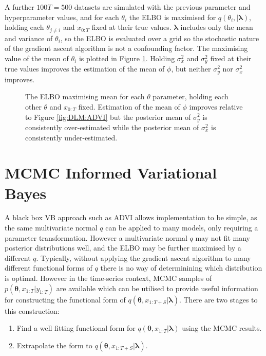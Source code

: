 \documentclass[12pt,a4paper]{article}%
\numberwithin{equation}{section}
\begin{document}
A further $100 T = 500$ datasets are simulated with the previous parameter and hyperparameter values, and for each $\theta_i$ the ELBO is maximised for $q(\theta_i, | \boldsymbol{\lambda})$, holding each $\theta_{j \neq i}$ and $x_{0:T}$ fixed at their true values. $\boldsymbol{\lambda}$ includes only the mean and variance of $\theta_i$, so the ELBO is evaluated over a grid so the stochastic nature of the gradient ascent algorithm is not a confounding factor. The maximising value of the mean of $\theta_i$ is plotted in Figure \ref{fig:DLM:Numeric}. Holding $\sigma^2_x$ and $\sigma^2_y$ fixed at their true values improves the estimation of the mean of $\phi$, but neither $\sigma^2_y$ nor $\sigma^2_x$ improves. 

\begin{figure}[h]
\centering
\caption{The ELBO maximising mean for each $\theta$ parameter, holding each other $\theta$ and $x_{0:T}$ fixed. Estimation of the mean of $\phi$ improves relative to Figure \ref{fig:DLM:ADVI} but the posterior mean of $\sigma^2_y$ is consistently over-estimated while the posterior mean of $\sigma^2_x$ is consistently under-estimated.}
\label{fig:DLM:Numeric}
\end{figure}

\section{MCMC Informed Variational Bayes}
\label{MIVB}

A black box VB approach such as ADVI allows implementation to be simple, as the same multivariate normal $q$ can be applied to many models, only requiring a parameter transformation. However a multivariate normal $q$ may not fit many posterior distributions well, and the ELBO may be further maximised by a different $q$. Typically, without applying the gradient ascent algorithm to many different functional forms of $q$ there is no way of determinining which distribution is optimal. However in the time-series context, MCMC samples of $p(\boldsymbol{\theta}, x_{1:T} | y_{1:T})$ are available which can be utilised to provide useful information for constructing the functional form of $q(\boldsymbol{\theta}, x_{1:T+S} | \boldsymbol{\lambda})$. There are two stages to this construction:
\begin{enumerate}
\item Find a well fitting functional form for $q(\boldsymbol{\theta}, x_{1:T} | \boldsymbol{\lambda})$ using the MCMC results.
\item Extrapolate the form to $q(\boldsymbol{\theta}, x_{1:T+S} | \boldsymbol{\lambda})$.
\end{enumerate}
\end{document}

